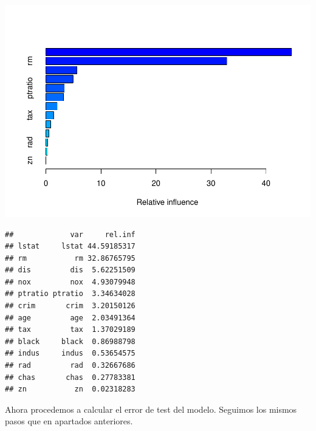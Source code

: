 \documentclass[]{article}
\newenvironment{Shaded}{\begin{snugshade}}{\end{snugshade}}
\newcommand{\KeywordTok}[1]{\textcolor[rgb]{0.13,0.29,0.53}{\textbf{{#1}}}}
\newcommand{\DataTypeTok}[1]{\textcolor[rgb]{0.13,0.29,0.53}{{#1}}}
\newcommand{\DecValTok}[1]{\textcolor[rgb]{0.00,0.00,0.81}{{#1}}}
\newcommand{\StringTok}[1]{\textcolor[rgb]{0.31,0.60,0.02}{{#1}}}
\newcommand{\NormalTok}[1]{{#1}}
\begin{document}
\includegraphics{TrabajoPracticas3_files/figure-latex/unnamed-chunk-59-1.pdf}

\begin{verbatim}
##             var     rel.inf
## lstat     lstat 44.59185317
## rm           rm 32.86765795
## dis         dis  5.62251509
## nox         nox  4.93079948
## ptratio ptratio  3.34634028
## crim       crim  3.20150126
## age         age  2.03491364
## tax         tax  1.37029189
## black     black  0.86988798
## indus     indus  0.53654575
## rad         rad  0.32667686
## chas       chas  0.27783381
## zn           zn  0.02318283
\end{verbatim}

Ahora procedemos a calcular el error de test del modelo. Seguimos los
mismos pasos que en apartados anteriores.

\begin{Shaded}
\end{Shaded}
\end{document}
